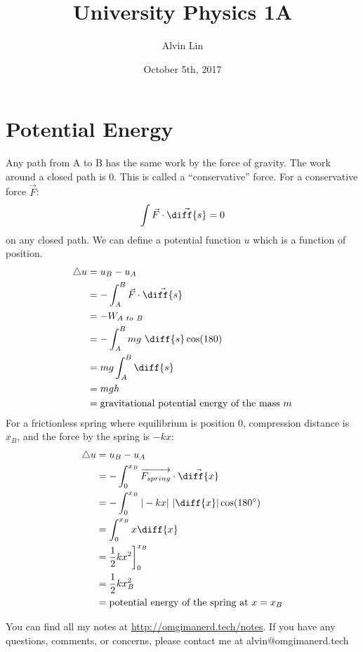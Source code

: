 \documentclass[letterpaper, 12pt]{math}
\title{University Physics 1A}
\author{Alvin Lin}
\date{October 5th, 2017}
\begin{document}
\maketitle

\section*{Potential Energy}
Any path from A to B has the same work by the force of gravity. The work around
a closed path is 0. This is called a ``conservative'' force. For a conservative
force \( \vec{F} \):
\[ \int\vec{F}\cdot\vec{\diff{s}} = 0 \]
on any closed path. We can define a potential function \( u \) which is a
function of position.
\begin{align*}
  \triangle{u} &= u_B-u_A \\
  &= -\int_{A}^{B}\vec{F}\cdot\vec{\diff{s}} \\
  &= -W_{A~to~B} \\
  &= -\int_{A}^{B}mg~\diff{s}\cos(180) \\
  &= mg\int_{A}^{B}\diff{s} \\
  &= mgh \\
  &= \text{gravitational potential energy of the mass } m
\end{align*}
For a frictionless spring where equilibrium is position 0, compression distance
is \( x_B \), and the force by the spring is \( -kx \):
\begin{align*}
  \triangle{u} &= u_B-u_A \\
  &= -\int_{0}^{x_B}\overrightarrow{F_{spring}}\cdot\vec{\diff{x}} \\
  &= -\int_{0}^{x_B}|-kx|~|\diff{x}|\cos(180^{\circ}) \\
  &= \int_{0}^{x_B}x\diff{x} \\
  &= \frac{1}{2}kx^2\bigg]_{0}^{x_B} \\
  &= \frac{1}{2}kx_B^2 \\
  &= \text{potential energy of the spring at }x = x_B
\end{align*}

\begin{center}
  You can find all my notes at \url{http://omgimanerd.tech/notes}. If you have
  any questions, comments, or concerns, please contact me at
  alvin@omgimanerd.tech
\end{center}
\end{document}
